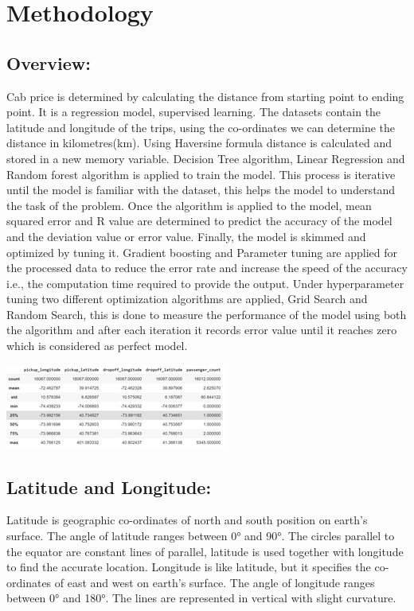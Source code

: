 \documentclass[journal,twoside,web]{ieeecolor}
\begin{document}
\section{Methodology}
\label{Methodology}
\subsection{Overview:}
Cab price is determined by calculating the distance from starting point to ending point. It is a regression model, supervised learning. The datasets contain the latitude and longitude of the trips, using the co-ordinates we can determine the distance in kilometres(km). Using Haversine formula distance is calculated and stored in a new memory variable. Decision Tree algorithm, Linear Regression and Random forest algorithm is applied to train the model. This process is iterative until the model is familiar with the dataset, this helps the model to understand the task of the problem. Once the algorithm is applied to the model, mean squared error and R value are determined to predict the accuracy of the model and the deviation value or error value. Finally, the model is skimmed and optimized by tuning it. Gradient boosting and Parameter tuning are applied for the processed data to reduce the error rate and increase the speed of the accuracy i.e., the computation time required to provide the output. Under hyperparameter tuning two different optimization algorithms are applied, Grid Search and Random Search, this is done to measure the performance of the model using both the algorithm and after each iteration it records error value until it reaches zero which is considered as perfect model.
\\
\begin{center}
\includegraphics[scale=0.90]{Picture5.png}
\end{center}
\subsection{Latitude and Longitude:}
Latitude is geographic co-ordinates of north and south position on earth’s surface. The angle of latitude ranges between 0° and 90°. The circles parallel to the equator are constant lines of parallel, latitude is used together with longitude to find the accurate location. Longitude is like latitude, but it specifies the co-ordinates of east and west on earth’s surface. The angle of longitude  ranges  between  0° and 180°. The lines are represented in vertical with slight curvature.
\end{document}
